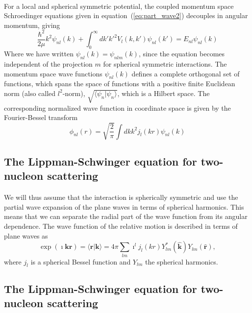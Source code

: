 \documentclass[%
twoside,                 %
final,                   %
10pt]{article}
\begin{document}
\paragraph{}
For a local and spherical symmetric potential, 
the coupled momentum space Schroedinger equations given in equation~(\ref{eq:part_wave2})
decouples in angular momentum, 
giving
\begin{equation}
\frac{\hbar^2}{2\mu} k^2 \psi_{n l}(k) +\int_{0}^\infty dk' {k'}^2 V_{l}(k,k') \psi_{n l }(k')=E_{n l} \psi_{n l}(k) 
  \label{eq:momentum_space}
\end{equation}   
Where we have written $\psi_{n l }(k)=\psi_{nlm}(k)$, since the 
equation becomes independent of the projection $m$ for spherical symmetric interactions. 
The momentum space wave functions $\psi_{n l}(k)$ defines a complete orthogonal set 
of functions, which spans the space of functions with a positive finite Euclidean norm 
 (also called $l^2$-norm), $\sqrt{\langle\psi_n\vert\psi_n\rangle}$, which 
is a Hilbert space. The corresponding normalized wave function in coordinate space
is given by the Fourier-Bessel transform 
\[
  \phi_{n l}(r)  = \sqrt{\frac{2}{\pi}}\int dk k^2 j_l(kr) \psi_{n l}(k)
\]



\subsection*{The Lippman-Schwinger equation for two-nucleon scattering}

\paragraph{}
We will thus assume that the interaction is spherically symmetric and use
the partial wave expansion of the plane waves in
terms of spherical harmonics.
This means that we can separate the radial part of the wave function from its
angular dependence. The wave function of the relative motion is described
in terms of plane waves as
\[
\exp{(\imath \mathbf{kr})}=\langle\mathbf{r}\vert\mathbf{k}\rangle=4\pi\sum_{lm}\imath^{l}j_{l}(kr)Y_{lm}^{*}(\mathbf{\hat{k}})Y_{lm}(\mathbf{\hat{r}}),
\]
where $j_l$ is a spherical Bessel function and $Y_{lm}$ the
spherical harmonics.



\subsection*{The Lippman-Schwinger equation for two-nucleon scattering}
\end{document}
